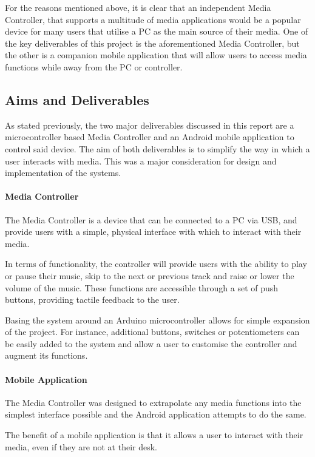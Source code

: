 \documentclass{article}
\begin{document}
			For the reasons mentioned above, it is clear that an independent Media Controller, that supports a multitude of media applications would be a popular device for many users that utilise a PC as the main source of their media. One of the key deliverables of this project is the aforementioned Media Controller, but the other is a companion mobile application that will allow users to access media functions while away from the PC or controller.
					
		\subsection{Aims and Deliverables}
			As stated previously, the two major deliverables discussed in this report are a microcontroller based Media Controller and an Android mobile application to control said device. The aim of both deliverables is to simplify the way in which a user interacts with media. This was a major consideration for design and implementation of the systems.
			
			\paragraph{Media Controller}
				The Media Controller is a device that can be connected to a PC via USB, and provide users with a simple,  physical interface with which to interact with their media. 
				
				In terms of functionality, the controller will provide users with the ability to play or pause their music, skip to the next or previous track and raise or lower the volume of the music. These functions are accessible through a set of push buttons, providing tactile feedback to the user.
				
				Basing the system around an Arduino microcontroller \cite{Arduino:online} allows for simple expansion of the project. For instance, additional buttons, switches or potentiometers can be easily added to the system and allow a user to customise the controller and augment its functions.
			
			\paragraph{Mobile Application}
				The Media Controller was designed to extrapolate any media functions into the simplest interface possible and the Android application attempts to do the same.
				
				The benefit of a mobile application is that it allows a user to interact with their media, even if they are not at their desk. 
				
\end{document}

